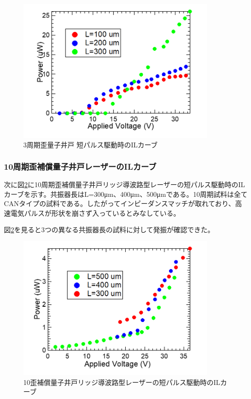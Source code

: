 {\begin{figure}[h]
	\centering
	\includegraphics[width=10cm]{figure/fig_3_2_3QW_ridge_GS_power.png}
		\caption{3周期歪量子井戸 短パルス駆動時のILカーブ}
		\label{fig:fig_3_2_3QW_ridge_GS_power}
\end{figure}


\newpage
\subsubsection{10周期歪補償量子井戸レーザーのILカーブ}
次に図\ref{fig:fig_3_2_10QW_ridge_GS_power}に10周期歪補償量子井戸リッジ導波路型レーザーの短パルス駆動時のILカーブを示す。共振器長はL=300\si{\micro\metre}、400\si{\micro\metre}、500\si{\micro\metre}である。10周期試料は全てCANタイプの試料である。したがってインピーダンスマッチが取れており、高速電気パルスが形状を崩さず入っているとみなしている。

図\ref{fig:fig_3_2_10QW_ridge_GS_power}を見ると3つの異なる共振器長の試料に対して発振が確認できた。
\begin{figure}[h]
	\centering
	\includegraphics[width=10cm]{figure/fig_3_2_10QW_ridge_GS_power.png}
		\caption{10歪補償量子井戸リッジ導波路型レーザーの短パルス駆動時のILカーブ}
		\label{fig:fig_3_2_10QW_ridge_GS_power}
\end{figure}
\clearpage
}

